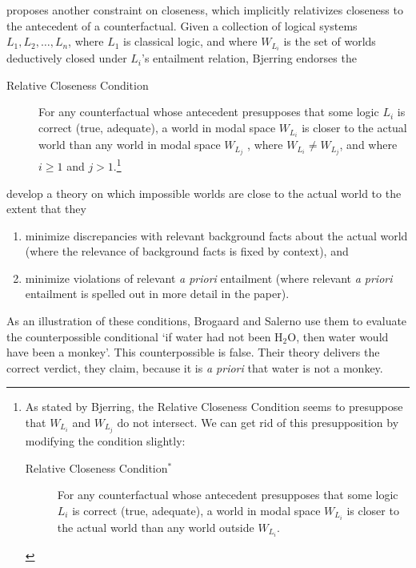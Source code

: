 \citet[348]{Bjerring2013-BJEOC} proposes another constraint on closeness, which implicitly relativizes closeness to the antecedent of a counterfactual. Given a collection of logical systems $L_1, L_2,\ldots, L_n$, where $L_1$ is classical logic, and where $W_{L_i}$ is the set of worlds deductively closed under $L_i$'s entailment relation, Bjerring endorses the
\begin{description}
\item[Relative Closeness Condition] For any counterfactual whose antecedent presupposes that some logic $L_i$ is correct (true, adequate), a world in modal space $W_{L_i}$ is closer to the actual world than any world in modal space $W_{L_j}$ , where $W_{L_i} \neq W_{L_j}$, and where $i \geq 1$ and $j>1$.\footnote{As stated by Bjerring, the Relative Closeness Condition seems to presuppose that $W_{L_i}$ and $W_{L_j}$ do not intersect.  We can get rid of this presupposition by modifying the condition slightly:
\begin{description}
\item[Relative Closeness Condition$^*$] For any counterfactual whose antecedent presupposes that some logic $L_i$ is correct (true, adequate), a world in modal space $W_{L_i}$ is closer to the actual world than any world outside $W_{L_i}$.
\end{description}}
\end{description}

\citet{Brogaard2013-BROROC-3} develop a theory on which impossible worlds are close to the actual world to the extent that they
\begin{enumerate}
\item minimize discrepancies with relevant background facts about the actual world (where the relevance of background facts is fixed by context), and
\item minimize violations of relevant \emph{a priori} entailment (where relevant \emph{a priori} entailment is spelled out in more detail in the paper).
\end{enumerate}
As an illustration of these conditions, Brogaard and Salerno use them to evaluate the counterpossible conditional `if water had not been H$_2$O, then water would have been a monkey'.  This counterpossible is false.  Their theory delivers the correct verdict, they claim, because it is \emph{a priori} that water is not a monkey.

